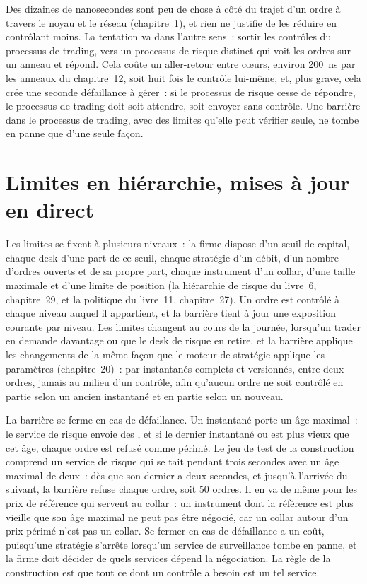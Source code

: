 Des dizaines de nanosecondes sont peu de chose à côté du trajet d'un ordre à travers le noyau et le réseau (chapitre~1), et rien ne justifie
de les réduire en contrôlant moins. La tentation va dans l'autre sens~: sortir les contrôles du processus de trading, vers un processus de risque
distinct qui voit les ordres sur un anneau et répond. Cela coûte un aller-retour entre cœurs, environ \qty{200}{\nano\second} par les
anneaux du chapitre~12, soit huit fois le contrôle lui-même, et, plus grave, cela crée une seconde défaillance à gérer~: si le processus de risque cesse de répondre, le processus de trading doit
soit attendre, soit envoyer sans contrôle. Une barrière dans le processus de trading, avec des limites qu'elle peut vérifier seule, ne tombe en panne que d'une seule façon.

\section{Limites en hiérarchie, mises à jour en direct}

Les limites se fixent à plusieurs niveaux~: la firme dispose d'un seuil de capital, chaque desk d'une part de ce seuil, chaque stratégie d'un débit, d'un nombre
d'ordres ouverts et de sa propre part, chaque instrument d'un collar, d'une taille maximale et d'une limite de position (la hiérarchie de risque du livre~6,
chapitre~29, et la politique du livre~11, chapitre~27). Un ordre est contrôlé à chaque niveau auquel il appartient, et la barrière tient à jour une
exposition courante par niveau. Les limites changent au cours de la journée, lorsqu'un trader en demande davantage ou que le desk de risque en retire,
et la barrière applique les changements de la même façon que le moteur de stratégie applique les paramètres (chapitre~20)~: par instantanés complets et versionnés,
entre deux ordres, jamais au milieu d'un contrôle, afin qu'aucun ordre ne soit contrôlé en partie selon un ancien instantané et en partie
selon un nouveau.

La barrière se ferme en cas de défaillance. Un instantané porte un âge maximal~: le service de risque envoie des , et si le dernier
instantané ou  est plus vieux que cet âge, chaque ordre est refusé comme périmé. Le jeu de test de la construction comprend un service de risque
qui se tait pendant trois secondes avec un âge maximal de deux~: dès que son dernier  a deux secondes, et jusqu'à l'arrivée du suivant,
la barrière refuse chaque ordre, soit 50 ordres. Il en va de même pour les prix de référence qui servent au collar~: un instrument dont la référence est
plus vieille que son âge maximal ne peut pas être négocié, car un collar autour d'un prix périmé n'est pas un collar. Se fermer en cas de défaillance a un coût, puisqu'une stratégie
s'arrête lorsqu'un service de surveillance tombe en panne, et la firme doit décider de quels services dépend la négociation. La règle de la construction est que
tout ce dont un contrôle a besoin est un tel service.

